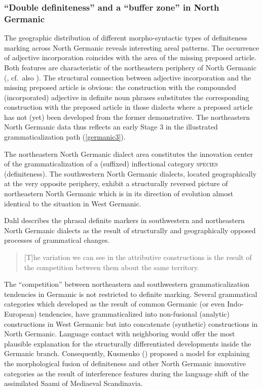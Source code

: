 {
\subsubsection{“Double definiteness” and a “buffer zone” in North Germanic}\label{buffer}
The geographic distribution of different morpho-syntactic types of definiteness marking across North Germanic reveals interesting areal patterns. The occurrence of adjective incorporation coincides with the area of the missing preposed article. Both features are characteristic of the northeastern periphery of North Germanic (\citealt{delsing1996b}, cf.~also \citealt{riesler2001a,riesler2002a}). The structural connection between adjective incorporation and the missing preposed article is obvious: the construction with the compounded (incorporated) adjective in definite noun phrases substitutes the corresponding construction with the preposed article in those dialects where a preposed article has not (yet) been developed from the former demonstrative. The northeastern North Germanic data thus reflects an early Stage 3 in the illustrated grammaticalization path (\ref{germanic3}).

The northeastern North Germanic dialect area constitutes the innovation center of the grammaticalization of a (suffixed) inflectional category \textsc{species} (definiteness). The southwestern North Germanic dialects, located geographically at the very opposite periphery, exhibit a structurally reversed picture of northeastern North Germanic which is in its direction of evolution almost identical to the situation in West Germanic.

Dahl describes the phrasal definite markers in southwestern and northeastern North Germanic dialects as the result of structurally and geographically opposed processes of grammatical changes.
\begin{quote}
[T]he variation we can see in the attributive constructions is the result of the competition between them about the same territory. \citep[147]{dahl2003}
\end{quote}
The “competition” between northeastern and southwestern grammaticalization tendencies in Germanic is not restricted to definite marking. Several grammatical categories which developed as the result of common Germanic (or even Indo-European) tendencies, have grammaticalized into non-fusional (analytic) constructions in West Germanic but into concatenate (synthetic) constructions in North Germanic. Language contact with neighboring  would offer the most plausible explanation for the structurally differentiated developments inside the Germanic branch. Consequently, Kusmenko (\citeyear{kusmenko2008}) proposed a model for explaining the morphological fusion of definiteness and other North Germanic innovative categories as the result of interference features during the language shift of the assimilated Saami of Mediaeval Scandinavia.

}
